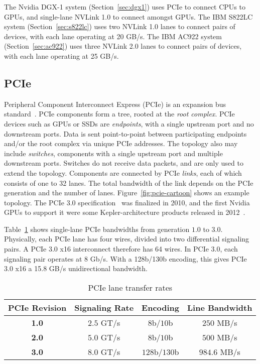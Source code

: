 The Nvidia DGX-1 system (Section~\ref{sec:dgx1}) uses PCIe to connect CPUs to GPUs, and single-lane NVLink 1.0 to connect amongst GPUs.
The IBM S822LC system (Section~\ref{sec:s822lc}) uses two NVLink 1.0 lanes to connect pairs of devices, with each lane operating at 20 GB/s.
The IBM AC922 system (Section~\ref{sec:ac922}) uses three NVLink 2.0 lanes to connect pairs of devices, with each lane operating at 25 GB/s.

\subsection{PCIe}

Peripheral Component Interconnect Express (PCIe) is an expansion bus standard~\cite{pcie10}.
PCIe components form a tree, rooted at the \textit{root complex}.
PCIe devices such as GPUs or SSDs are \textit{endpoints}, with a single upstream port and no downstream ports.
Data is sent point-to-point between participating endpoints and/or the root complex via unique PCIe addresses.
The topology also may include \textit{switches}, components with a single upstream port and multiple downstream ports.
Switches do not receive data packets, and are only used to extend the topology.
Components are connected by PCIe \textit{links}, each of which consists of one to 32 lanes.
The total bandwidth of the link depends on the PCIe generation and the number of lanes.
Figure~\ref{fig:pcie-cartoon} shows an example topology.
The PCIe 3.0 specification~\cite{pcie30} was finalized in 2010, and the first Nvidia GPUs to support it were some Kepler-architecture products released in 2012~\cite{nyland2012inside}.

Table~\ref{tab:pcie-lane-rates} shows single-lane PCIe bandwidths from generation $1.0$ to $3.0$.
Physically, each PCIe lane has four wires, divided into two differential signaling pairs.
A PCIe 3.0 x16 interconnect therefore has 64 wires.
In PCIe 3.0, each signaling pair operates at 8 Gb/s.
With a 128b/130b encoding, this gives PCIe 3.0 x16 a 15.8 GB/s unidirectional bandwidth.

\begin{table}[ht]
	\centering
	\caption[PCIe lane transfer rates]{PCIe lane transfer rates}
	\label{tab:pcie-lane-rates}
	\begin{tabular}{cccc}
		\hline
		\textbf{PCIe Revision} & \textbf{Signaling Rate} & \textbf{Encoding} & \textbf{Line Bandwidth} \\ \hline
		\textbf{1.0}           & $2.5$ GT/s                & $8$b/$10$b            & $250$   MB/s      \\ \hline
		\textbf{2.0}           & $5.0$ GT/s                & $8$b/$10$b            & $500$   MB/s      \\ \hline
		\textbf{3.0}           & $8.0$ GT/s                & $128$b/$130$b         & $984.6$ MB/s      \\ \hline
	\end{tabular}
\end{table}


